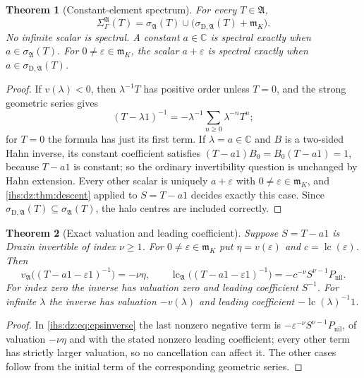 \documentclass[11pt,a4paper]{article}
\numberwithin{equation}{section}
\newtheorem{theorem}{Theorem}[section]
\theoremstyle{definition}
\theoremstyle{remark}
\newcommand{\C}{\mathbb C}
\newcommand{\mK}{\mathfrak m_K}
\newcommand{\eps}{\varepsilon}
\newcommand{\Alg}{\mathfrak A}
\newcommand{\SigA}{\Sigma^{\Alg}_\Gamma}
\newcommand{\sigD}{\sigma_{\mathrm D,\Alg}}
\newcommand{\lc}{\operatorname{lc}}
\begin{document}
\begin{theorem}[Constant-element spectrum]\label{ihs:dz:thm:halo}
For every $T\in\Alg$,
\begin{equation}\label{ihs:dz:eq:halo}
 \SigA(T)=\sigma_\Alg(T)\cup\bigl(\sigD(T)+\mK\bigr).
\end{equation}
No infinite scalar is spectral. A constant $a\in\C$ is spectral exactly when
$a\in\sigma_\Alg(T)$. For $0\ne\eps\in\mK$, the scalar $a+\eps$ is spectral
exactly when $a\in\sigD(T)$.
\end{theorem}
\begin{proof}
If $v(\lambda)<0$, then $\lambda^{-1}T$ has positive order unless $T=0$, and
the strong geometric series gives
\begin{equation}\label{ihs:dz:eq:infiniteinverse}
 (T-\lambda1)^{-1}=-\lambda^{-1}\sum_{n\ge0}\lambda^{-n}T^n;
\end{equation}
for $T=0$ the formula has just its first term. If $\lambda=a\in\C$ and $B$
is a two-sided Hahn inverse, its constant coefficient satisfies
$(T-a1)B_0=B_0(T-a1)=1$, because $T-a1$ is constant; so the ordinary
invertibility question is unchanged by Hahn extension. Every other scalar is
uniquely $a+\eps$ with $0\ne\eps\in\mK$, and \cref{ihs:dz:thm:descent}
applied to $S=T-a1$ decides exactly this case. Since
$\sigD(T)\subseteq\sigma_\Alg(T)$, the halo centres are included correctly.
\end{proof}

\begin{theorem}[Exact valuation and leading coefficient]\label{ihs:dz:thm:scale}
Suppose $S=T-a1$ is Drazin invertible of index $\nu\ge1$. For
$0\ne\eps\in\mK$ put $\eta=v(\eps)$ and $c=\lc(\eps)$. Then
\begin{equation}\label{ihs:dz:eq:scale}
 v_\Alg\bigl((T-a1-\eps1)^{-1}\bigr)=-\nu\eta,\qquad
 \lc_\Alg\bigl((T-a1-\eps1)^{-1}\bigr)=-c^{-\nu}S^{\nu-1}P_{\mathrm{nil}}.
\end{equation}
For index zero the inverse has valuation zero and leading coefficient
$S^{-1}$. For infinite $\lambda$ the inverse has valuation $-v(\lambda)$ and
leading coefficient $-\lc(\lambda)^{-1}1$.
\end{theorem}
\begin{proof}
In \eqref{ihs:dz:eq:epsinverse} the last nonzero negative term is
$-\eps^{-\nu}S^{\nu-1}P_{\mathrm{nil}}$, of valuation $-\nu\eta$ and with the
stated nonzero leading coefficient; every other term has strictly larger
valuation, so no cancellation can affect it. The other cases follow from the
initial term of the corresponding geometric series.
\end{proof}
\end{document}
